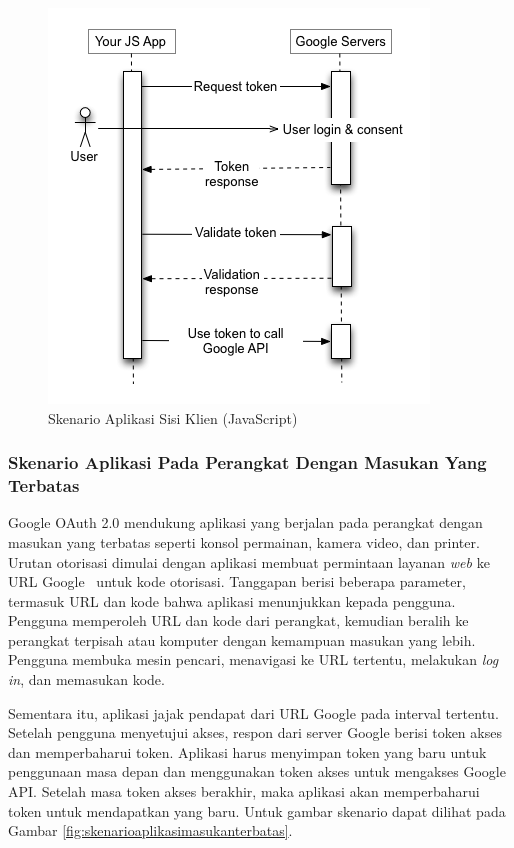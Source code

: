 \begin{figure}[H]
\centering
\includegraphics[scale=0.8]{Gambar/skenario2.png}
\caption[Skenario Aplikasi Sisi Klien (JavaScript)]{Skenario Aplikasi
Sisi Klien (JavaScript)}
\label{fig:skenarioaplikasisisiklien}
\end{figure}

\subsubsection{Skenario Aplikasi Pada Perangkat Dengan Masukan Yang Terbatas}
Google OAuth 2.0 mendukung aplikasi yang berjalan pada perangkat dengan masukan
yang terbatas seperti konsol permainan, kamera video, dan printer. Urutan
otorisasi dimulai dengan aplikasi membuat permintaan layanan {\it web} ke URL
Google \ untuk kode otorisasi. Tanggapan berisi beberapa parameter, termasuk URL dan
kode bahwa aplikasi menunjukkan kepada pengguna. Pengguna memperoleh URL dan kode dari
perangkat, kemudian beralih ke perangkat terpisah atau komputer dengan kemampuan
masukan yang lebih. Pengguna membuka mesin pencari, menavigasi ke URL tertentu,
melakukan {\it log in}, dan memasukan kode.

Sementara itu, aplikasi jajak pendapat dari URL Google pada interval tertentu.
Setelah pengguna menyetujui akses, respon dari server Google berisi token akses
dan memperbaharui token. Aplikasi harus menyimpan token yang baru untuk
penggunaan masa depan dan menggunakan token akses untuk mengakses Google API.
Setelah masa token akses berakhir, maka aplikasi akan memperbaharui token untuk
mendapatkan yang baru. Untuk gambar skenario dapat dilihat pada Gambar
\ref{fig:skenarioaplikasimasukanterbatas}.

